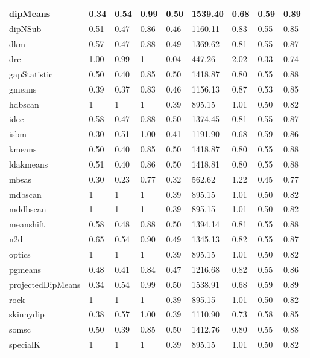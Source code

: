 \begin{table}[H]
\begin{tabular}{|l|l|l|l|l|l|l|l|l|}
dipMeans & 0.34 & 0.54 & 0.99 & 0.50 & 1539.40 & 0.68 & 0.59 & 0.89 \\
\hline
dipNSub & 0.51 & 0.47 & 0.86 & 0.46 & 1160.11 & 0.83 & 0.55 & 0.85 \\
\hline
dkm & 0.57 & 0.47 & 0.88 & 0.49 & 1369.62 & 0.81 & 0.55 & 0.87 \\
\hline
drc & 1.00 & 0.99 & 1 & 0.04 & 447.26 & 2.02 & 0.33 & 0.74 \\
\hline
gapStatistic & 0.50 & 0.40 & 0.85 & 0.50 & 1418.87 & 0.80 & 0.55 & 0.88 \\
\hline
gmeans & 0.39 & 0.37 & 0.83 & 0.46 & 1156.13 & 0.87 & 0.53 & 0.85 \\
\hline
hdbscan & 1 & 1 & 1 & 0.39 & 895.15 & 1.01 & 0.50 & 0.82 \\
\hline
idec & 0.58 & 0.47 & 0.88 & 0.50 & 1374.45 & 0.81 & 0.55 & 0.87 \\
\hline
isbm & 0.30 & 0.51 & 1.00 & 0.41 & 1191.90 & 0.68 & 0.59 & 0.86 \\
\hline
kmeans & 0.50 & 0.40 & 0.85 & 0.50 & 1418.87 & 0.80 & 0.55 & 0.88 \\
\hline
ldakmeans & 0.51 & 0.40 & 0.86 & 0.50 & 1418.81 & 0.80 & 0.55 & 0.88 \\
\hline
mbsas & 0.30 & 0.23 & 0.77 & 0.32 & 562.62 & 1.22 & 0.45 & 0.77 \\
\hline
mdbscan & 1 & 1 & 1 & 0.39 & 895.15 & 1.01 & 0.50 & 0.82 \\
\hline
mddbscan & 1 & 1 & 1 & 0.39 & 895.15 & 1.01 & 0.50 & 0.82 \\
\hline
meanshift & 0.58 & 0.48 & 0.88 & 0.50 & 1394.14 & 0.81 & 0.55 & 0.88 \\
\hline
n2d & 0.65 & 0.54 & 0.90 & 0.49 & 1345.13 & 0.82 & 0.55 & 0.87 \\
\hline
optics & 1 & 1 & 1 & 0.39 & 895.15 & 1.01 & 0.50 & 0.82 \\
\hline
pgmeans & 0.48 & 0.41 & 0.84 & 0.47 & 1216.68 & 0.82 & 0.55 & 0.86 \\
\hline
projectedDipMeans & 0.34 & 0.54 & 0.99 & 0.50 & 1538.91 & 0.68 & 0.59 & 0.89 \\
\hline
rock & 1 & 1 & 1 & 0.39 & 895.15 & 1.01 & 0.50 & 0.82 \\
\hline
skinnydip & 0.38 & 0.57 & 1.00 & 0.39 & 1110.90 & 0.73 & 0.58 & 0.85 \\
\hline
somsc & 0.50 & 0.39 & 0.85 & 0.50 & 1412.76 & 0.80 & 0.55 & 0.88 \\
\hline
specialK & 1 & 1 & 1 & 0.39 & 895.15 & 1.01 & 0.50 & 0.82 \\

\end{tabular}
\end{table}
